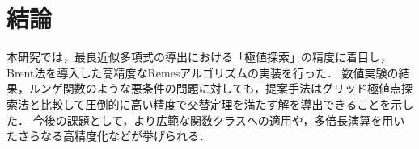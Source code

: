 \section{結論}
\label{sec:conclusion}

本研究では，最良近似多項式の導出における「極値探索」の精度に着目し，Brent法を導入した高精度なRemesアルゴリズムの実装を行った．
数値実験の結果，ルンゲ関数のような悪条件の問題に対しても，提案手法はグリッド極値点探索法と比較して圧倒的に高い精度で交替定理を満たす解を導出できることを示した．
今後の課題として，より広範な関数クラスへの適用や，多倍長演算を用いたさらなる高精度化などが挙げられる．
